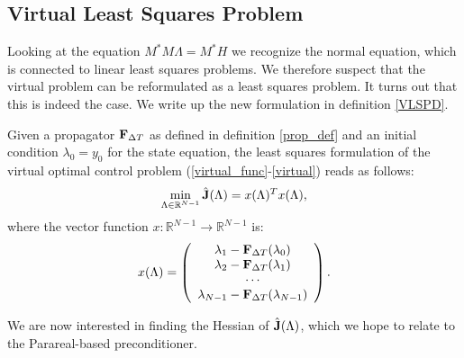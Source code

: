 \subsection{Virtual Least Squares Problem}
Looking at the equation $M^*M\Lambda =M^*H$ we recognize the normal equation, which is connected to linear least squares problems. We therefore suspect that the virtual problem can be reformulated as a least squares problem. It turns out that this is indeed the case. We write up the new formulation in definition \ref{VLSPD}.
\begin{definition} \label{VLSPD}
Given a propagator $\bold F_{\Delta T}$ as defined in definition \ref{prop_def} and an initial condition $\lambda_0=y_0$ for the state equation, the least squares formulation of the virtual optimal control problem (\ref{virtual_func}-\ref{virtual}) reads as follows:
\begin{align}
\min_{\Lambda\in\mathbb{R}^{N-1}}\hat{\bold J}(\Lambda) = x(\Lambda)^Tx(\Lambda), \label{non_lin_LS}
\end{align}
where the vector function $x:\mathbb{R}^{N-1}\rightarrow \mathbb{R}^{N-1}$ is:
\begin{align}
x(\Lambda)= \left( \begin{array}{c}  
   \lambda_1 - \bold F_{\Delta T}(\lambda_0) \\ 
   \lambda_2 - \bold F_{\Delta T}(\lambda_1) \\
   \cdots  \\
   \lambda_{N-1} -\bold F_{\Delta T}(\lambda_{N-1}) \\
   \end{array}  \right).
\end{align}
\end{definition}
\noindent
We are now interested in finding the Hessian of $\hat{\bold J}(\Lambda)$, which we hope to relate to the Parareal-based preconditioner. 
